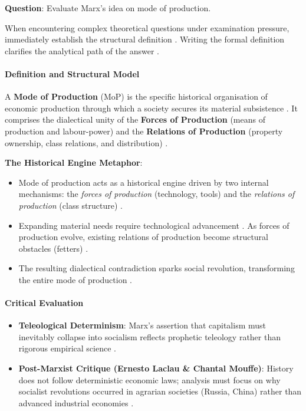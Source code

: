 \begin{PYQLink}
\textbf{Question}: Evaluate Marx's idea on mode of production. 
\end{PYQLink}

\begin{CriticalPoint}
When encountering complex theoretical questions under examination pressure, immediately establish the structural definition . Writing the formal definition clarifies the analytical path of the answer .
\end{CriticalPoint}

\paragraph{Definition and Structural Model}
A \textbf{Mode of Production} ($\text{MoP}$) is the specific historical organisation of economic production through which a society secures its material subsistence . It comprises the dialectical unity of the \textbf{Forces of Production} (means of production and labour-power) and the \textbf{Relations of Production} (property ownership, class relations, and distribution) .

\begin{ExampleBox}
\textbf{The Historical Engine Metaphor}:
\begin{itemize}
    \item Mode of production acts as a historical engine driven by two internal mechanisms: the \textit{forces of production} (technology, tools) and the \textit{relations of production} (class structure) .
    \item Expanding material needs require technological advancement . As forces of production evolve, existing relations of production become structural obstacles (fetters) .
    \item The resulting dialectical contradiction sparks social revolution, transforming the entire mode of production .
\end{itemize}
\end{ExampleBox}

\paragraph{Critical Evaluation}
\begin{itemize}
    \item \textbf{Teleological Determinism}: Marx's assertion that capitalism must inevitably collapse into socialism reflects prophetic teleology rather than rigorous empirical science .
    \item \textbf{Post-Marxist Critique (Ernesto Laclau \& Chantal Mouffe)}: History does not follow deterministic economic laws; analysis must focus on why socialist revolutions occurred in agrarian societies (Russia, China) rather than advanced industrial economies .
\end{itemize}

